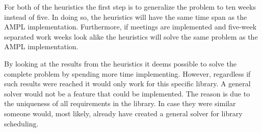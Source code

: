 For both of the heuristics the first step is to generalize the problem to ten weeks instead of five. In doing so, the heuristics will have the same time span as the AMPL implementation. Furthermore, if meetings are implemented and five-week separated work weeks look alike the heuristics will solve the same problem as the AMPL implementation. 

By looking at the results from the heuristics it deems possible to solve the complete problem by spending more time implementing. However, regardless if such results were reached it would only work for this specific library. A general solver would not be a feature that could be implemented. The reason is due to the uniqueness of all requirements in the library. In case they were similar someone would, most likely, already have created a general solver for library scheduling. 